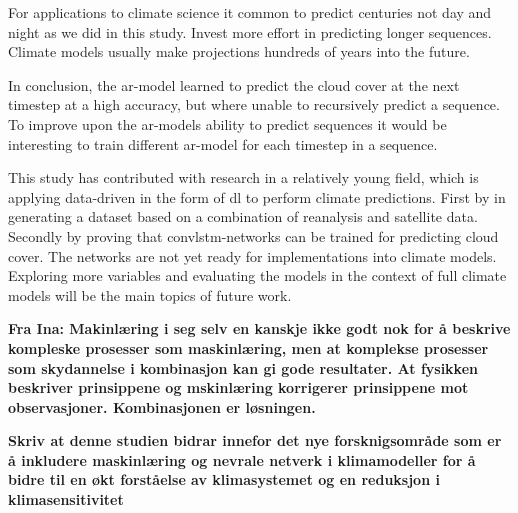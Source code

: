 For applications to climate science it common to predict centuries not day and night as we did in this study. Invest more effort in predicting longer sequences. Climate models usually make projections hundreds of years into the future.

In conclusion, the \acrshort{ar}-model learned to predict the cloud cover at the next timestep at a high accuracy, but where unable to recursively predict a sequence. To improve upon the \acrshort{ar}-models ability to predict sequences it would be interesting to train different \acrshort{ar}-model for each timestep in a sequence. 

This study has contributed with research in a relatively young field, which is applying data-driven in the form of \acrshort{dl} to perform climate predictions. First by in generating a dataset based on a combination of reanalysis and satellite data. Secondly by proving that \acrshort{convlstm}-networks can be trained for predicting cloud cover. The networks are not yet ready for implementations into climate models. Exploring more variables and evaluating the models in the context of full climate models will be the main topics of future work. 


\textbf{Fra Ina: Makinlæring i seg selv en kanskje ikke godt nok for å beskrive kompleske prosesser som maskinlæring, men at komplekse prosesser som skydannelse i kombinasjon kan gi gode resultater. At fysikken beskriver prinsippene og mskinlæring korrigerer prinsippene mot observasjoner. Kombinasjonen er løsningen.}

\textbf{Skriv at denne studien bidrar innefor det nye forsknigsområde som er å inkludere maskinlæring og nevrale netverk i klimamodeller for å bidre til en økt forståelse av klimasystemet og en reduksjon i klimasensitivitet}



